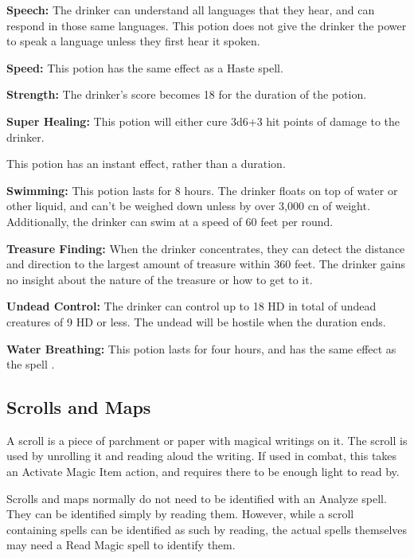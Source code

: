 \begin{multicols*}{2}
\textbf{Speech:} The drinker can understand all languages that they hear, and can respond in those same languages. This potion does not give the drinker the power to speak a language unless they first hear it spoken.

\textbf{Speed:} This potion has the same effect as a Haste spell.

\textbf{Strength:} The drinker’s  score becomes 18 for the duration of the potion.

\textbf{Super Healing:} This potion will either cure 3d6+3 hit points of damage to the drinker.

This potion has an instant effect, rather than a duration.

\textbf{Swimming:} This potion lasts for 8 hours. The drinker floats on top of water or other liquid, and can’t be weighed down unless by over 3,000 cn of weight. Additionally, the drinker can swim at a speed of 60 feet per round.

\textbf{Treasure Finding:} When the drinker concentrates, they can detect the distance and direction to the largest amount of treasure within 360 feet. The drinker gains no insight about the nature of the treasure or how to get to it.

\textbf{Undead Control:} The drinker can control up to 18 HD in total of undead creatures of 9 HD or less. The undead will be hostile when the duration ends.

\textbf{Water Breathing:} This potion lasts for four hours, and has the same effect as the spell .

\subsection{Scrolls and Maps}
A scroll is a piece of parchment or paper with magical writings on it. The scroll is used by unrolling it and reading aloud the writing. If used in combat, this takes an Activate Magic Item action, and requires there to be enough light to read by.

Scrolls and maps normally do not need to be identified with an Analyze spell. They can be identified simply by reading them. However, while a scroll containing spells can be identified as such by reading, the actual spells themselves may need a Read Magic spell to identify them.


\end{multicols*}
